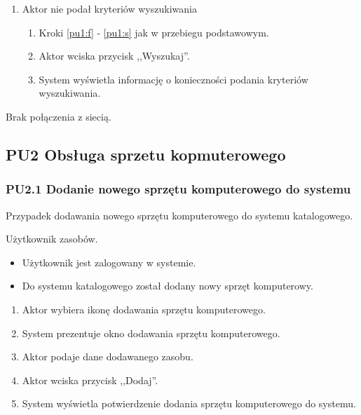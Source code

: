 \begin{enumerate}
\item Aktor nie podał kryteriów wyszukiwania
	\begin{enumerate}[label*=\arabic*.]
	\item Kroki \ref{pu1:f} - \ref{pu1:s} jak w przebiegu podstawowym.
	\item Aktor wciska przycisk ,,Wyszukaj''.
	\item System wyświetla informację o konieczności podania kryteriów wyszukiwania.
	\end{enumerate}
\end{enumerate}

Brak połączenia z siecią.



\subsection{PU2 Obsługa sprzetu kopmuterowego} \label{pu2}
\subsubsection{PU2.1 Dodanie nowego sprzętu komputerowego do systemu}

Przypadek dodawania nowego sprzętu komputerowego do systemu katalogowego.

Użytkownik zasobów.

\begin{itemize}
\item Użytkownik jest zalogowany w systemie.
\end{itemize}

\begin{itemize}
\item Do systemu katalogowego został dodany nowy sprzęt komputerowy.
\end{itemize}

\begin{enumerate}
\item \label{pu2.1:1} Aktor wybiera ikonę dodawania sprzętu komputerowego.
\item System prezentuje okno dodawania sprzętu komputerowego.
\item Aktor podaje dane dodawanego zasobu.
\item \label{pu2.1:4} Aktor wciska przycisk ,,Dodaj''.
\item System wyświetla potwierdzenie dodania sprzętu komputerowego do systemu.
\end{enumerate}

